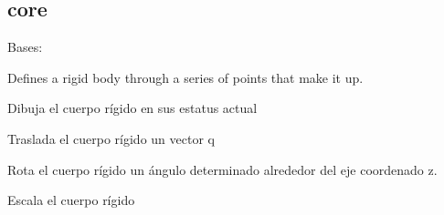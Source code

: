 \documentclass[letterpaper,10pt,english]{sphinxmanual}
\begin{document}
\subsection{core}
\label{\detokenize{_src/didactic:core}}\label{\detokenize{_src/didactic:module-rkd.didactic.core}}

\begin{fulllineitems}
\label{\detokenize{_src/didactic:rkd.didactic.core.RigidBody2D}}
Bases: 

Defines a rigid body through a series of points that 
make it up.

\begin{fulllineitems}
\label{\detokenize{_src/didactic:rkd.didactic.core.RigidBody2D.draw}}
Dibuja el cuerpo rígido en sus estatus actual

\end{fulllineitems}


\begin{fulllineitems}
\label{\detokenize{_src/didactic:rkd.didactic.core.RigidBody2D.move}}
Traslada el cuerpo rígido un vector q

\end{fulllineitems}


\begin{fulllineitems}
\label{\detokenize{_src/didactic:rkd.didactic.core.RigidBody2D.rotate}}
Rota el cuerpo rígido un ángulo determinado alrededor 
del eje coordenado z.

\end{fulllineitems}


\begin{fulllineitems}
\label{\detokenize{_src/didactic:rkd.didactic.core.RigidBody2D.scale}}
Escala el cuerpo rígido

\end{fulllineitems}


\end{fulllineitems}
\end{document}
